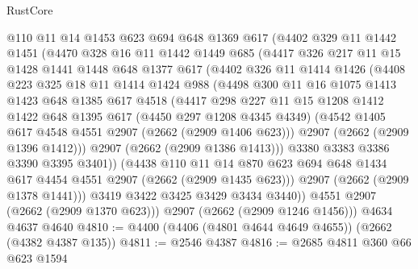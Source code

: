 \begin{lexlean}{RustCore}
\begin{coremodule}
        @110
        @11
        @14
        @1453
        @623
        @694
        @648
        @1369
        @617
        (@4402
          @329
          @11
          @1442
          @1451
          (@4470
            @328
            @16
            @11
            @1442
            @1449
            @685
            (@4417
              @326
              @217
              @11
              @15
              @1428
              @1441
              @1448
              @648
              @1377
              @617
              (@4402
                @326
                @11
                @1414
                @1426
                (@4408
                  @223
                  @325
                  @18
                  @11
                  @1414
                  @1424
                  @988
                  (@4498
                    @300
                    @11
                    @16
                    @1075
                    @1413
                    @1423
                    @648
                    @1385
                    @617
                    @4518
                    (@4417
                      @298
                      @227
                      @11
                      @15
                      @1208
                      @1412
                      @1422
                      @648
                      @1395
                      @617
                      (@4450 @297 @1208 @4345 @4349)
                      (@4542 @1405 @617 @4548 @4551 @2907 (@2662 (@2909 @1406 @623)))
                      @2907
                      (@2662 (@2909 @1396 @1412)))
                    @2907
                    (@2662 (@2909 @1386 @1413)))
                  @3380
                  @3383
                  @3386
                  @3390
                  @3395
                  @3401))
              (@4438
                @110
                @11
                @14
                @870
                @623
                @694
                @648
                @1434
                @617
                @4454
                @4551
                @2907
                (@2662 (@2909 @1435 @623)))
              @2907
              (@2662 (@2909 @1378 @1441)))
            @3419
            @3422
            @3425
            @3429
            @3434
            @3440))
        @4551
        @2907
        (@2662 (@2909 @1370 @623)))
      @2907
      (@2662 (@2909 @1246 @1456)))
    @4634
    @4637
    @4640
@4810 := @4400 (@4406 (@4801 @4644 @4649 @4655)) (@2662 (@4382 @4387 @135))
@4811 := @2546 @4387
@4816 := @2685 @4811 @360 @66 @623 @1594

\end{coremodule}
\end{lexlean}
